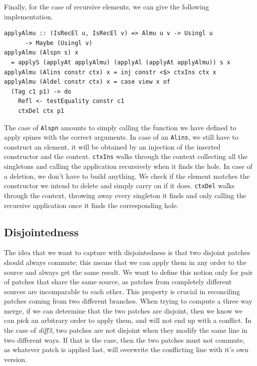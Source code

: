 \documentclass[11pt, titlepage]{article}
\newcommand{\toHaskell}[1]{\texttt{#1}\xspace}
\newcommand{\diffthree}{\emph{diff3}\xspace}
\newcommand{\alins}{\toHaskell{Alins}}
\newcommand{\alspn}{\toHaskell{Alspn}}
\begin{document}
Finally, for the case of recursive elements, we can give the following 
implementation.

\begin{verbatim}
applyAlmu :: (IsRecEl u, IsRecEl v) => Almu u v -> Usingl u 
	  -> Maybe (Usingl v)
applyAlmu (Alspn s) x 
  = applyS (applyAt applyAlmu) (applyAl (applyAt applyAlmu)) s x
applyAlmu (Alins constr ctx) x = inj constr <$> ctxIns ctx x
applyAlmu (Aldel constr ctx) x = case view x of
  (Tag c1 p1) -> do
    Refl <- testEquality constr c1
    ctxDel ctx p1
\end{verbatim}

The case of \alspn amounts to simply calling the function we have defined to 
apply spines with the correct arguments.
In case of an \alins, we still have to construct an element, it will be obtained
by an injection of the inserted constructor and the context. 
\texttt{ctxIns} walks through the context collecting all the singletons and 
calling the application recursively when it finds the hole.
In case of a deletion, we don't have to build anything. We check if the element 
matches the constructor we intend to delete and simply carry on if it does.
\texttt{ctxDel} walks through the context, throwing away every singleton it 
finds and only calling the recursive application once it finds the corresponding 
hole.

\subsection{Disjointedness}\label{disj}

The idea that we want to capture with disjointedness is that two disjoint patches should always commute; this means that we can apply them in any order to the source and always get the same result.
We want to define this notion only for pair of patches that share the same source, as patches from completely different sources are incomparable to each other. 
This property is crucial in reconciling patches coming from two different branches. When trying to compute a three way merge, if we can determine that the two patches are disjoint, then we know we can pick an arbitrary order to apply them, and will not end up with a conflict.
In the case of \diffthree, two patches are not disjoint when they modify the same line in two different ways. If that is the case, then the two patches must not commute, as whatever patch is applied last, will overwrite the conflicting line with it's own version.
\end{document}
